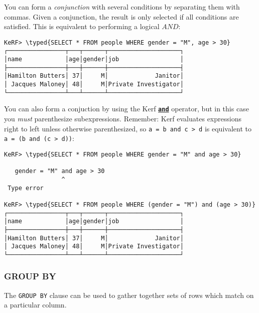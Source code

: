 \documentclass{article}
\newcommand{\typed}[1]{\textcolor{TealBlue}{#1}}
\newcommand{\primu}[2]{\hyperref[prim:#2]{\textbf{\texttt{#1}}}}
\newcommand{\prim}[1]{\primu{#1}{#1}}
\begin{document}
You can form a \emph{conjunction} with several conditions by separating them with commas. Given a conjunction, the result is only selected if all conditions are satisfied. This is equivalent to performing a logical $AND$:
\begin{Verbatim}
KeRF> \typed{SELECT * FROM people WHERE gender = "M", age > 30}
┌────────────────┬───┬──────┬────────────────────┐
│name            │age│gender│job                 │
├────────────────┼───┼──────┼────────────────────┤
│Hamilton Butters│ 37│     M│             Janitor│
│ Jacques Maloney│ 48│     M│Private Investigator│
└────────────────┴───┴──────┴────────────────────┘
\end{Verbatim}

You can also form a conjuction by using the Kerf \prim{and} operator, but in this case you \emph{must} parenthesize subexpressions. Remember: Kerf evaluates expressions right to left unless otherwise parenthesized, so \texttt{a = b and c > d} is equivalent to \texttt{a = (b and (c > d))}:
\begin{Verbatim}
KeRF> \typed{SELECT * FROM people WHERE gender = "M" and age > 30}

   gender = "M" and age > 30
                ^
 Type error

KeRF> \typed{SELECT * FROM people WHERE (gender = "M") and (age > 30)}
┌────────────────┬───┬──────┬────────────────────┐
│name            │age│gender│job                 │
├────────────────┼───┼──────┼────────────────────┤
│Hamilton Butters│ 37│     M│             Janitor│
│ Jacques Maloney│ 48│     M│Private Investigator│
└────────────────┴───┴──────┴────────────────────┘
\end{Verbatim}

\pagebreak
\subsubsection{GROUP BY}
The \texttt{GROUP BY} clause can be used to gather together sets of rows which match on a particular column. 

%
\end{document}
